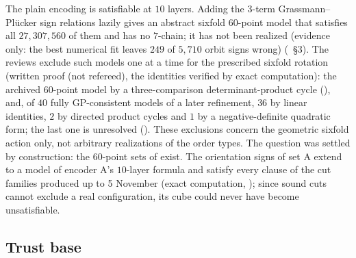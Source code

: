\begin{remark}\label{k8:gap}
The plain encoding is satisfiable at $10$ layers. Adding the $3$-term Grassmann--Pl\"ucker sign relations lazily gives an
abstract sixfold $60$-point model that satisfies all $27{,}307{,}560$ of them and has no $7$-chain; it has not been
realized (evidence only: the best numerical fit leaves $249$ of $5{,}710$ orbit signs wrong) (~\S3). The reviews exclude such models one at a time for the prescribed sixfold rotation (written proof
(not refereed), the identities verified by exact computation): the archived $60$-point model by a three-comparison
determinant-product cycle (), and, of $40$ fully GP-consistent models of a later refinement, $36$ by
linear identities, $2$ by directed product cycles and $1$ by a negative-definite quadratic form; the last one is
unresolved (). These exclusions concern
the geometric sixfold action only, not arbitrary realizations of the order types. The question was settled by
construction: the $60$-point sets of  exist. The orientation signs of set A extend to a model of encoder A's
$10$-layer formula and satisfy every clause of the cut families produced up to 5 November (exact computation,
); since sound cuts cannot exclude a real configuration, its cube could never have become unsatisfiable.
\end{remark}

\subsection{Trust base}\label{k8:sec:trust}

